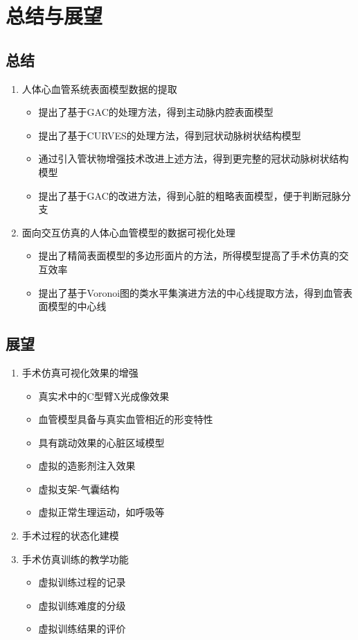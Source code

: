 \section{总结与展望}

\subsection{总结}
\begin{frame}
\begin{enumerate}
\item 人体心血管系统表面模型数据的提取
\begin{itemize}
\item 提出了基于GAC的处理方法，得到主动脉内腔表面模型
\item 提出了基于CURVES的处理方法，得到冠状动脉树状结构模型
\item 通过引入管状物增强技术改进上述方法，得到更完整的冠状动脉树状结构模型
\item 提出了基于GAC的改进方法，得到心脏的粗略表面模型，便于判断冠脉分支
\end{itemize}
\item 面向交互仿真的人体心血管模型的数据可视化处理
\begin{itemize}
\item 提出了精简表面模型的多边形面片的方法，所得模型提高了手术仿真的交互效率
\item 提出了基于Voronoi图的类水平集演进方法的中心线提取方法，得到血管表面模型的中心线
\end{itemize}
\end{enumerate}
\end{frame}

\subsection{展望}
\begin{frame}
\begin{enumerate}
\item 手术仿真可视化效果的增强
\begin{itemize}
\item 真实术中的C型臂X光成像效果
\item 血管模型具备与真实血管相近的形变特性
\item 具有跳动效果的心脏区域模型
\item 虚拟的造影剂注入效果
\item 虚拟支架-气囊结构
\item 虚拟正常生理运动，如呼吸等
\end{itemize}
\item 手术过程的状态化建模
\item 手术仿真训练的教学功能
\begin{itemize}
\item 虚拟训练过程的记录
\item 虚拟训练难度的分级
\item 虚拟训练结果的评价
\end{itemize}
\end{enumerate}
\end{frame}

\begin{frame}

\end{frame}

\begin{frame}

\end{frame} 